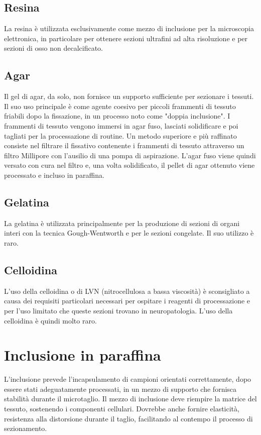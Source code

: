 \subsection{Resina}
La resina è utilizzata esclusivamente come mezzo di inclusione per la microscopia elettronica, in particolare per ottenere sezioni ultrafini ad alta risoluzione e per sezioni di osso non decalcificato.

\subsection{Agar}
Il gel di agar, da solo, non fornisce un supporto sufficiente per sezionare i tessuti. Il suo uso principale è come agente coesivo per piccoli frammenti di tessuto friabili dopo la fissazione, in un processo noto come "doppia inclusione". I frammenti di tessuto vengono immersi in agar fuso, lasciati solidificare e poi tagliati per la processazione di routine. Un metodo superiore e più raffinato consiste nel filtrare il fissativo contenente i frammenti di tessuto attraverso un filtro Millipore con l'ausilio di una pompa di aspirazione. L'agar fuso viene quindi versato con cura nel filtro e, una volta solidificato, il pellet di agar ottenuto viene processato e incluso in paraffina.

\subsection{Gelatina}
La gelatina è utilizzata principalmente per la produzione di sezioni di organi interi con la tecnica Gough-Wentworth e per le sezioni congelate. Il suo utilizzo è raro.

\subsection{Celloidina}
L'uso della celloidina o di LVN (nitrocellulosa a bassa viscosità) è sconsigliato a causa dei requisiti particolari necessari per ospitare i reagenti di processazione e per l'uso limitato che queste sezioni trovano in neuropatologia. L'uso della celloidina è quindi molto raro.

\section{Inclusione in paraffina}
L'inclusione prevede l'incapsulamento di campioni orientati correttamente, dopo essere stati adeguatamente processati, in un mezzo di supporto che fornisca stabilità durante il microtaglio. Il mezzo di inclusione deve riempire la matrice del tessuto, sostenendo i componenti cellulari. Dovrebbe anche fornire elasticità, resistenza alla distorsione durante il taglio, facilitando al contempo il processo di sezionamento.


